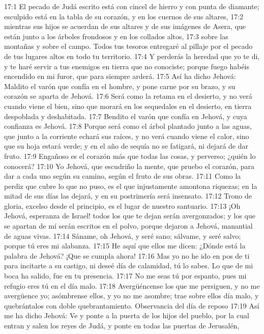 17:1 El pecado de Judá escrito está con cincel de hierro y con punta de diamante; esculpido está en la tabla de su corazón, y en los cuernos de sus altares, 
17:2 mientras sus hijos se acuerdan de sus altares y de sus imágenes de Asera, que están junto a los árboles frondosos y en los collados altos, 
17:3 sobre las montañas y sobre el campo. Todos tus tesoros entregaré al pillaje por el pecado de tus lugares altos en todo tu territorio. 
17:4 Y perderás la heredad que yo te di, y te haré servir a tus enemigos en tierra que no conociste; porque fuego habéis encendido en mi furor, que para siempre arderá. 
17:5 Así ha dicho Jehová: Maldito el varón que confía en el hombre, y pone carne por su brazo, y su corazón se aparta de Jehová. 
17:6 Será como la retama en el desierto, y no verá cuando viene el bien, sino que morará en los sequedales en el desierto, en tierra despoblada y deshabitada. 
17:7 Bendito el varón que confía en Jehová, y cuya confianza es Jehová. 
17:8 Porque será como el árbol plantado junto a las aguas, que junto a la corriente echará sus raíces, y no verá cuando viene el calor, sino que su hoja estará verde; y en el año de sequía no se fatigará, ni dejará de dar fruto. 
17:9 Engañoso es el corazón más que todas las cosas, y perverso; ¿quién lo conocerá? 
17:10 Yo Jehová, que escudriño la mente, que pruebo el corazón, para dar a cada uno según su camino, según el fruto de sus obras. 
17:11 Como la perdiz que cubre lo que no puso, es el que injustamente amontona riquezas; en la mitad de sus días las dejará, y en su postrimería será insensato. 
17:12 Trono de gloria, excelso desde el principio, es el lugar de nuestro santuario. 
17:13 ¡Oh Jehová, esperanza de Israel! todos los que te dejan serán avergonzados; y los que se apartan de mí serán escritos en el polvo, porque dejaron a Jehová, manantial de aguas vivas. 
17:14 Sáname, oh Jehová, y seré sano; sálvame, y seré salvo; porque tú eres mi alabanza. 
17:15 He aquí que ellos me dicen: ¿Dónde está la palabra de Jehová? ¡Que se cumpla ahora! 
17:16 Mas yo no he ido en pos de ti para incitarte a su castigo, ni deseé día de calamidad, tú lo sabes. Lo que de mi boca ha salido, fue en tu presencia. 
17:17 No me seas tú por espanto, pues mi refugio eres tú en el día malo. 
17:18 Avergüéncense los que me persiguen, y no me avergüence yo; asómbrense ellos, y yo no me asombre; trae sobre ellos día malo, y quebrántalos con doble quebrantamiento. 
Observancia del día de reposo 
17:19 Así me ha dicho Jehová: Ve y ponte a la puerta de los hijos del pueblo, por la cual entran y salen los reyes de Judá, y ponte en todas las puertas de Jerusalén, 
